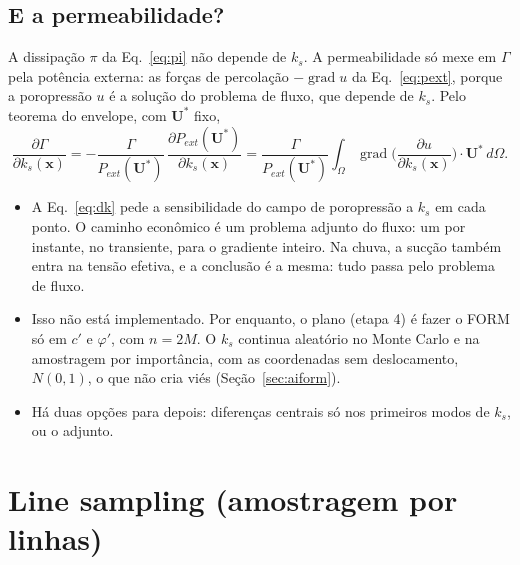 \documentclass[11pt,a4paper]{article}
\begin{document}
\subsection{E a permeabilidade?}\label{sec:k}
A dissipação $\pi$ da Eq.~\eqref{eq:pi} não depende de $k_s$. A permeabilidade só mexe em $\Gamma$ pela potência
externa: as forças de percolação $-\operatorname{grad} u$ da Eq.~\eqref{eq:pext}, porque a poropressão $u$ é a solução
do problema de fluxo, que depende de $k_s$. Pelo teorema do envelope, com $\bm U^*$ fixo,
\begin{equation}
  \frac{\partial\Gamma}{\partial k_s(\bm x)} = -\frac{\Gamma}{P_{ext}(\bm U^*)}\,\frac{\partial P_{ext}(\bm U^*)}{\partial k_s(\bm x)}
  = \frac{\Gamma}{P_{ext}(\bm U^*)}\int_\Omega \operatorname{grad}\Big(\frac{\partial u}{\partial k_s(\bm x)}\Big)\cdot\bm U^*\,d\Omega.
  \label{eq:dk}
\end{equation}
\begin{itemize}
  \item A Eq.~\eqref{eq:dk} pede a sensibilidade do campo de poropressão a $k_s$ em cada ponto. O caminho econômico é
    um problema adjunto do fluxo: um por instante, no transiente, para o gradiente inteiro. Na chuva, a sucção também
    entra na tensão efetiva, e a conclusão é a mesma: tudo passa pelo problema de fluxo.
  \item Isso não está implementado. Por enquanto, o plano (etapa 4) é fazer o FORM só em $c'$ e $\varphi'$, com
    $n = 2M$. O $k_s$ continua aleatório no Monte Carlo e na amostragem por importância, com as coordenadas sem
    deslocamento, $N(0, 1)$, o que não cria viés (Seção~\ref{sec:aiform}).
  \item Há duas opções para depois: diferenças centrais só nos primeiros modos de $k_s$, ou o adjunto.
\end{itemize}

\section{Line sampling (amostragem por linhas)}\label{sec:ls}
\end{document}

